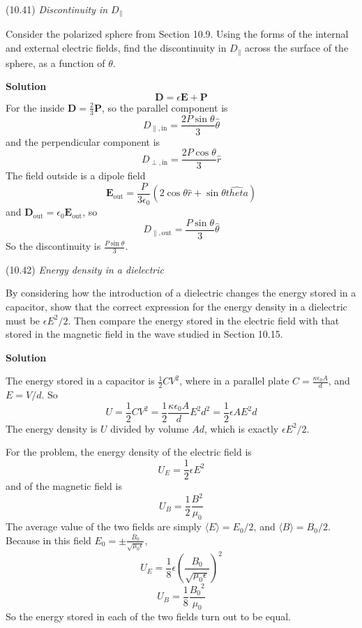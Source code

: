 \documentclass{article}
\begin{document}

\begin{homeworkProblem}
	(10.41) \textit{Discontinuity in $D_\parallel$}

	Consider the polarized sphere from Section 10.9. Using the forms of the internal and external electric fields, find the discontinuity in $D_\parallel$ across the surface of the sphere, as a function of $\theta$.

	\textbf{Solution}
	\[
		\mathbf{D}=\epsilon\mathbf{E}+\mathbf{P}
	\]
	For the inside $\mathbf{D}=\frac{2}{3}\mathbf{P}$, so the parallel component is
	\[
		D_{\parallel,\mathrm{in}}=\frac{2P\sin\theta}{3}\hat{\theta}
	\]
	and the perpendicular component is
	\[
		D_{\perp,\mathrm{in}}=\frac{2P\cos\theta}{3}\hat{r}
	\]
	The field outside is a dipole field
	\[
		\mathbf{E}_\mathrm{out}=\frac{P}{3\epsilon_0}\left(2\cos\theta\hat{r}+\sin\theta\hat{theta}\right)
	\]
	and $\mathbf{D}_\mathrm{out}=\epsilon_0\mathbf{E}_\mathrm{out}$, so
	\[
		D_{\parallel,\mathrm{out}}=\frac{P\sin\theta}{3}\hat{\theta}
	\]
	So the discontinuity is $\frac{P\sin\theta}{3}$.
\end{homeworkProblem}


\begin{homeworkProblem}
	(10.42) \textit{Energy density in a dielectric}

	By considering how the introduction of a dielectric changes the energy stored in a capacitor, show that the correct expression for the energy density in a dielectric must be $\epsilon E^2/2$. Then compare the energy stored in the electric field with that stored in the magnetic field in the wave studied in Section 10.15.

	\textbf{Solution}

	The energy stored in a capacitor is $\frac{1}{2}CV^2$, where in a parallel plate $C=\frac{\kappa\epsilon_0 A}{d}$, and $E=V/d$. So
	\[
		U=\frac{1}{2}CV^2=\frac{1}{2}\frac{\kappa\epsilon_0 A}{d}E^2d^2=\frac{1}{2}\epsilon AE^2d
	\]
	The energy density is $U$ divided by volume $Ad$, which is exactly $\epsilon E^2/2$.

	For the problem, the energy density of the electric field is
	\[
		U_E=\frac{1}{2}\epsilon E^2
	\]
	and of the magnetic field is
	\[
		U_B=\frac{1}{2}\frac{B^2}{\mu_0}
	\]
	The average value of the two fields are simply $\langle E\rangle=E_0/2$, and $\langle B\rangle=B_0/2$. Because in this field $E_0=\pm\frac{B_0}{\sqrt{\mu_0\epsilon}}$,
	\[
		U_E=\frac{1}{8}\epsilon{\left(\frac{B_0}{\sqrt{\mu_0\epsilon}}\right)}^2
	\]
	\[
		U_B=\frac{1}{8}\frac{{B_0}^2}{\mu_0}
	\]
	So the energy stored in each of the two fields turn out to be equal.
\end{homeworkProblem}
\end{document}
